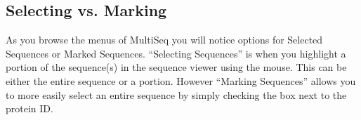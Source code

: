 \subsection{Selecting vs. Marking}
As you browse the menus of MultiSeq you will notice options for
\textsf{Selected Sequences} or \textsf{Marked Sequences}.  ``Selecting
Sequences'' is when you highlight a portion of the sequence(s) in the
sequence viewer using the mouse.  This can be either the entire sequence
or a portion.  However ``Marking Sequences'' allows you to more easily
select an entire sequence by simply checking the box next to the protein
ID.

